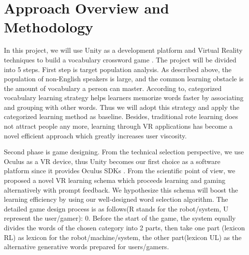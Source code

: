 \documentclass{vgtc}                          %
\begin{document}
\section{Approach Overview and Methodology}
In this project, we will use Unity as a development platform and Virtual Reality techniques to build a vocabulary crossword game \cite{ebrahimi2017unity}. The project will be divided into 5 steps. 
First step is target population analysis. As described above, the population of non-English speakers is large, and the common learning obstacle is the amount of vocabulary a person can master. According to\cite{asgari2011type, gu2003vocabulary}, categorized vocabulary learning strategy helps learners memorize words faster by associating and grouping with other words. Thus we will adopt this strategy and apply the categorized learning method as baseline. Besides, traditional rote learning does not attract people any more, learning through VR applications has become \cite{alfadil2020effectiveness} a novel efficient approach which greatly increases user viscosity. 

Second phase is game designing. From the technical selection perspective, we use Oculus as a VR device, thus Unity becomes our first choice as a software platform since it provides Oculus SDKs \cite{bouvier2019advanced}. From the scientific point of view, we proposed a novel VR learning schema which proceeds learning and gaming alternatively with prompt feedback. We hypothesize this schema will boost the learning efficiency by using our well-designed word selection algorithm. The detailed game design process is as follows(R stands for the robot/system, U represent the user/gamer):
0. Before the start of the game, the system equally divides the words of the chosen category into 2 parts, then take one part (lexicon RL) as lexicon for the robot/machine/system, the other part(lexicon UL) as the alternative generative words prepared for users/gamers.
\end{document}
